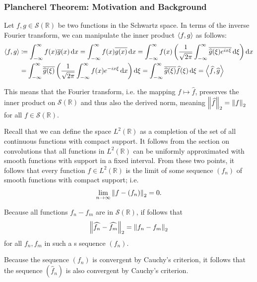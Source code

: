 \documentclass[11pt, a4paper]{article}
\newcommand{\diff}{\mathop{}\!\mathrm{d}} %
\newcommand{\R}{\mathbb{R}} %
\begin{document}
\subsubsection{Plancherel Theorem: Motivation and Background}
Let $ f, g \in \mathcal{S}(\R) $ be two functions in the Schwartz space. In terms of the inverse Fourier transform, we can manipulate the inner product $ \expval{f, g} $ as follows:
\begin{align*}
	\expval{f, g} &\coloneqq \int_{-\infty}^{\infty} f(x) \overline{g}(x) \diff x = \int_{-\infty}^{\infty} f(x) \overline{g(x)} \diff x = \int_{-\infty}^{\infty} f(x) \left(\frac{1}{\sqrt{2\pi}} \int_{-\infty}^{\infty} \overline{\widehat{g}(\xi)e^{ix\xi}}\diff \xi \right) \diff x\\
	&= \int_{-\infty}^{\infty} \overline{\widehat{g}(\xi)} \left( \frac{1}{\sqrt{2\pi}} \int_{-\infty}^{\infty} f(x) e^{-ix\xi} \diff x \right) \diff \xi = \int_{-\infty}^{\infty} \overline{\widehat{g}(\xi)} \widehat{f}(\xi) \diff \xi = \expval{\widehat{f}, \widehat{g}}
\end{align*}

This means that the Fourier transform, i.e. the mapping $ f \mapsto \widehat{f} $, preserves the inner product on $ \mathcal{S}(\R) $ and thus also the derived norm, meaning $ \norm{\widehat{f}}_{2} = \norm{f}_2 $ for all $ f \in \mathcal{S}(\R) $. 

Recall that we can define the space $ L^{2}(\R) $ as a completion of the set of all continuous functions with compact support. It follows from the section on convolutions that all functions in $ L^{2}(\R) $ can be uniformly approximated with smooth functions with support in a fixed interval. From these two points, it follows that every function $ f \in L^{2}(\R) $ is the limit of some sequence $ (f_n) $ of smooth functions with compact support; i.e.
\begin{align*}
	\lim_{n \to \infty} \norm{f - (f_n)}_2 = 0.
\end{align*}

Because all functions $ f_n - f_m $ are in $ \mathcal{S}(\R) $, if follows that 
\begin{align*}
	\norm{\widehat{f_n} - \widehat{f_m} }_{2} = \norm{f_n - f_m}_2 
\end{align*}
for all $ f_n, f_m $ in such a s sequence $ (f_n) $.

Because the sequence $ (f_n) $ is convergent by Cauchy's criterion, it follows that the sequence $ (\widehat{f}_n) $ is also convergent by Cauchy's criterion. 
\end{document}
